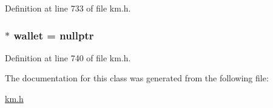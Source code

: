 Definition at line 733 of file km.\+h.

\subsubsection[{\texorpdfstring{wallet}{wallet}}]{ $\ast$ wallet = nullptr\hspace{0.3cm}{\ttfamily [protected]}}\hypertarget{class_k_1_1_klass_a5943d9c958085108c746fdc756c7aad3}{}\label{class_k_1_1_klass_a5943d9c958085108c746fdc756c7aad3}


Definition at line 740 of file km.\+h.



The documentation for this class was generated from the following file\+:\begin{DoxyCompactItemize}
\item 
\hyperlink{km_8h}{km.\+h}\end{DoxyCompactItemize}
